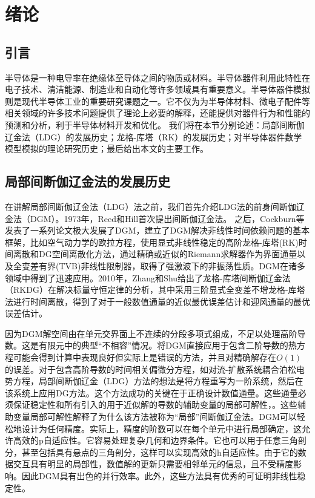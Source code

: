 \cleardoublepage

\section{绪论}

\subsection{引言}
半导体是一种电导率在绝缘体至导体之间的物质或材料。半导体器件利用此特性在电子技术、清洁能源、制造业和自动化等许多领域具有重要意义。半导体器件模拟则是现代半导体工业的重要研究课题之一。它不仅为为半导体材料、微电子配件等相关领域的许多技术问题提供了理论上必要的解释，还能提供对器件行为和性能的预测和分析，利于半导体材料开发和优化。
我们将在本节分别论述：局部间断伽辽金法（LDG）的发展历史；龙格-库塔（RK）的发展历史；对半导体器件数学模型模拟的理论研究历史；最后给出本文的主要工作。
\subsection{局部间断伽辽金法的发展历史}
在讲解局部间断伽辽金法（LDG）法之前，我们首先介绍LDG法的前身间断伽辽金法（DGM）。1973年，Reed和Hill首次提出间断伽辽金法\cite{reed1973triangular}。
之后，Cockburn等发表了一系列论文极大发展了DGM，建立了DGM解决非线性时间依赖问题的基本框架\cite{reed1973triangular,cockburn1991runge,cockburn1989tvb2,cockburn1989tvb3,cockburn1990runge,cockburn1998runge}，比如空气动力学的欧拉方程，使用显式非线性稳定的高阶龙格-库塔(RK)时间离散和DG空间离散化方法，通过精确或近似的Riemann求解器作为界面通量以及全变差有界(TVB)非线性限制器，取得了强激波下的非振荡性质。DGM在诸多领域中得到了迅速应用\cite{cockburn2000development}。2010年，Zhang和Shu给出了龙格-库塔间断伽辽金法（RKDG）在解决标量守恒定律的分析，其中采用三阶显式全变差不增龙格-库塔法进行时间离散，得到了对于一般数值通量的近似最优误差估计和迎风通量的最优误差估计\cite{zhang2010stabilitya}。

因为DGM解空间由在单元交界面上不连续的分段多项式组成，不足以处理高阶导数。这是有限元中的典型“不相容”情况。将DGM直接应用于包含二阶导数的热方程可能会得到计算中表现良好但实际上是错误的方法，并且对精确解存在$O(1)$的误差\cite{cockburn2001runge,zhang2003analysis}。对于包含高阶导数的时间相关偏微分方程，如对流-扩散系统耦合泊松电势方程，局部间断伽辽金（LDG）方法的想法是将方程重写为一阶系统，然后在该系统上应用DG方法。这个方法成功的关键在于正确设计数值通量。这些通量必须保证稳定性和所有引入的用于近似解的导数的辅助变量的局部可解性，。这些辅助变量局部可解性解释了为什么该方法被称为“局部”间断伽辽金法\cite{cockburn1998local}。DGM可以轻松地设计为任何精度。实际上，精度的阶数可以在每个单元中进行局部确定，这允许高效的p自适应性。它容易处理复杂几何和边界条件。它也可以用于任意三角剖分，甚至包括具有悬点的三角剖分，这样可以实现高效的h自适应性。由于它的数据交互具有明显的局部性，数值解的更新只需要相邻单元的信息，且不受精度影响。因此DGM具有出色的并行效率。此外，这些方法具有优秀的可证明非线性稳定性。

